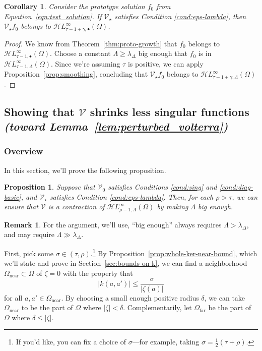 \documentclass{article}
\theoremstyle{definition}
\newtheorem{rmk}{Remark}
\theoremstyle{plain}
\newtheorem{prop}{Proposition}
\newtheorem{cor}{Corollary}
\newcommand{\singexp}[2]{\mathcal{H}L^\infty_{#1, #2}}
\newcommand{\singexpalg}[1]{\singexp{#1}{\bullet}}
\newcommand{\volterra}{\mathcal{V}}
\newcommand{\hardpart}{\mathcal{V}_0}
\newcommand{\softpart}{\mathcal{V}_\star}
\newcommand{\solproto}{f_0}
\newcommand{\domain}{\Omega}
\newcommand{\near}{\Omega_\text{near}}
\newcommand{\far}{\Omega_\text{far}}
\begin{document}
\begin{cor}\label{cor:pertub_f0}
Consider the prototype solution $\solproto$ from Equation~\eqref{eqn:test_solution}. If $\softpart$ satisfies {\em Condition \eqref{cond:eps-lambda}}, then $\softpart \solproto$ belongs to $\singexpalg{\tau-1+\gamma}(\domain)$.
\end{cor}
\begin{proof}
We know from Theorem~\ref{thm:proto-growth} that $\solproto$ belongs to $\singexpalg{\tau-1}(\domain)$. Choose a constant $\Lambda \ge \lambda_\Delta$ big enough that $\solproto$ is in $\singexp{\tau-1}{\Lambda}(\domain)$. Since we're assuming $\tau$ is positive, we can apply Proposition~\ref{prop:smoothing}, concluding that $\softpart \solproto$ belongs to $\singexp{\tau-1+\gamma}{\Lambda}(\domain)$.
\end{proof}
\subsection{Showing that $\volterra$ shrinks less singular functions \\ \textit{(toward Lemma~\ref{lem:perturbed_volterra})}}\label{sec:V is a contraction}
\subsubsection{Overview}
In this section, we'll prove the following proposition. %

\begin{prop}\label{prop:get-contraction}
Suppose that $\hardpart$ satisfies {\em Conditions \eqref{cond:sing}} and \eqref{cond:diag-basic}, and $\softpart$ satisfies {\em Condition \eqref{cond:eps-lambda}}. Then, for each $\rho > \tau$, we can ensure that $\volterra$ is a contraction of $\singexp{\rho-1}{\Lambda}(\domain)$ by making $\Lambda$ big enough.
\end{prop}
\begin{rmk}
For the argument, we'll use, ``big enough'' always requires $\Lambda > \lambda_\Delta$, and may require $\Lambda \gg \lambda_\Delta$.
\end{rmk}
First, pick some $\sigma \in (\tau, \rho)$.\footnote{If you'd like, you can fix a choice of $\sigma$---for example, taking $\sigma = \frac{1}{2}(\tau + \rho)$.} By Proposition~\ref{prop:whole-ker-near-bound}, which we'll state and prove in Section~\ref{sec:bounds on k}, we can find a neighborhood $\near \subset \domain$ of $\zeta = 0$ with the property that
\begin{equation}\label{near-limit}
|k(a, a')| \le \frac{\sigma}{|\zeta(a)|}
\end{equation}
for all $a, a' \in \near$. By choosing a small enough positive radius $\delta$, we can take $\near$ to be the part of $\domain$ where $|\zeta| < \delta$. Complementarily, let $\far$ be the part of $\domain$ where $\delta \le |\zeta|$.
\end{document}
